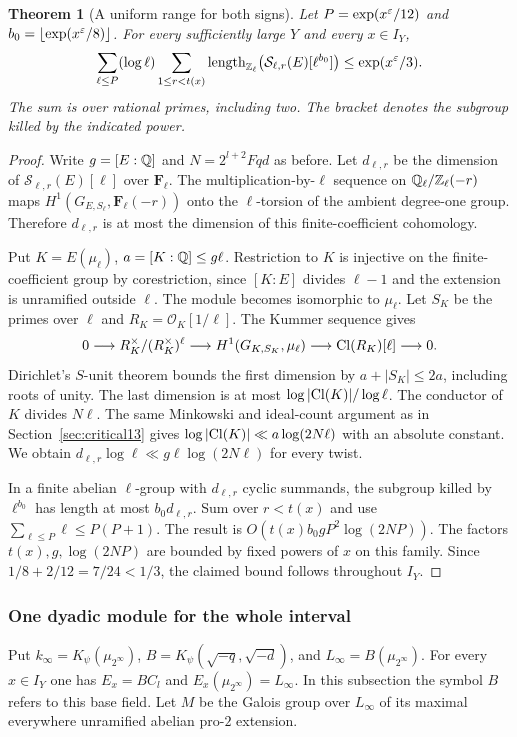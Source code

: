 \documentclass[a4paper,11pt]{article}
\newtheorem{theorem}[proposition]{Theorem}
\theoremstyle{definition}
\theoremstyle{remark}
\newcommand{\ZZ}{\mathbb Z}\newcommand{\ord}{\operatorname{ord}}
\newcommand{\len}{\operatorname{length}}\newcommand{\Res}{\operatorname*{Res}}
\numberwithin{equation}{section}
\begin{document}
\begin{theorem}[A uniform range for both signs]\label{thm:trunc15}
Let \(P=\exp(x^\varepsilon/12)\) and \(b_0=\lfloor\exp(x^\varepsilon/8)\rfloor\). For every sufficiently large \(Y\) and every \(x\in I_Y\),
\[
 \sum_{\ell\le P}(\log\ell)
       \sum_{1\le r<t(x)}
       \len_{\ZZ_\ell}\!\left(\mathcal S_{\ell,r}(E)[\ell^{b_0}]\right)
                    \le \exp(x^\eps/3).
\]
The sum is over rational primes, including two. The bracket denotes the subgroup killed by the indicated power.
\end{theorem}
\begin{proof}
Write \(g=[E:\mathbb Q]\) and \(N=2^{l+2}Fqd\) as before. Let \(d_{\ell,r}\) be the dimension of \(\mathcal S_{\ell,r}(E)[\ell]\) over \(\mathbf F_\ell\). The multiplication-by-\(\ell\) sequence on \(\QQ_\ell/\ZZ_\ell(-r)\) maps \(H^1(G_{E,S_\ell},\mathbf F_\ell(-r))\) onto the \(\ell\)-torsion of the ambient degree-one group. Therefore \(d_{\ell,r}\) is at most the dimension of this finite-coefficient cohomology.

Put \(K=E(\mu_\ell)\), \(a=[K:\mathbb Q]\le g\ell\). Restriction to \(K\) is injective on the finite-coefficient group by corestriction, since \([K:E]\) divides \(\ell-1\) and the extension is unramified outside \(\ell\). The module becomes isomorphic to \(\mu_\ell\). Let \(S_K\) be the primes over \(\ell\) and \(R_K=\mathcal O_K[1/\ell]\). The Kummer sequence gives
\[
 0\longrightarrow R_K^\times/(R_K^\times)^\ell
 \longrightarrow H^1(G_{K,S_K},\mu_\ell)
 \longrightarrow {\rm Cl}(R_K)[\ell]\longrightarrow0 .
\]
Dirichlet's \(S\)-unit theorem bounds the first dimension by \(a+|S_K|\le2a\), including roots of unity. The last dimension is at most \(\log|{\rm Cl}(K)|/\log\ell\). The conductor of \(K\) divides \(N\ell\). The same Minkowski and ideal-count argument as in Section~\ref{sec:critical13} gives \(\log|{\rm Cl}(K)|\ll a\log(2N\ell)\) with an absolute constant. We obtain \(d_{\ell,r}\log\ell\ll g\ell\log(2N\ell)\) for every twist.

In a finite abelian \(\ell\)-group with \(d_{\ell,r}\) cyclic summands, the subgroup killed by \(\ell^{b_0}\) has length at most \(b_0 d_{\ell,r}\). Sum over \(r<t(x)\) and use \(\sum_{\ell\le P}\ell\le P(P+1)\). The result is \(O(t(x)b_0 g P^2\log(2NP))\). The factors \(t(x),g,\log(2NP)\) are bounded by fixed powers of \(x\) on this family. Since \(1/8+2/12=7/24<1/3\), the claimed bound follows throughout \(I_Y\).
\end{proof}

\subsubsection{One dyadic module for the whole interval}\label{nav:II-09}
Put \(k_\infty=K_\psi(\mu_{2^\infty})\), \(B=K_\psi(\sqrt{-q},\sqrt{-d})\), and \(L_\infty=B(\mu_{2^\infty})\). For every \(x\in I_Y\) one has \(E_x=BC_l\) and \(E_x(\mu_{2^\infty})=L_\infty\). In this subsection the symbol \(B\) refers to this base field. Let \(M\) be the Galois group over \(L_\infty\) of its maximal everywhere unramified abelian pro-\(2\) extension.
\end{document}
